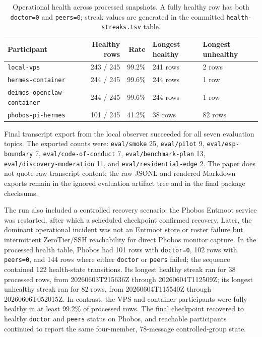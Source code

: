 \documentclass[11pt,a4paper,twocolumn]{article}
\begin{document}
\begin{table}[t]
\centering
\small
\caption{Operational health across processed snapshots. A fully healthy row
has both \texttt{doctor=0} and \texttt{peers=0}; streak values are generated in
the committed \texttt{health-streaks.tsv} table.}
\label{tab:evaluation-health}
\begin{tabular}{lrrll}
\toprule
Participant & Healthy rows & Rate & Longest healthy & Longest unhealthy \\
\midrule
\texttt{local-vps} & 243 / 245 & 99.2\% & 241 rows & 2 rows \\
\texttt{hermes-container} & 244 / 245 & 99.6\% & 244 rows & 1 row \\
\texttt{deimos-openclaw-container} & 244 / 245 & 99.6\% & 244 rows & 1 row \\
\texttt{phobos-pi-hermes} & 101 / 245 & 41.2\% & 38 rows & 82 rows \\
\bottomrule
\end{tabular}
\end{table}

Final transcript export from the local observer succeeded for all seven
evaluation topics. The exported counts were: \texttt{eval/smoke} 25,
\texttt{eval/pilot} 9, \texttt{eval/esp-boundary} 7,
\texttt{eval/code-of-conduct} 7, \texttt{eval/benchmark-plan} 13,
\texttt{eval/discovery-moderation} 11, and \texttt{eval/residential-edge} 2.
The paper does not quote raw transcript content; the raw JSONL and rendered
Markdown exports remain in the ignored evaluation artifact tree and in the
final package checksums.

The run also included a controlled recovery scenario: the Phobos Entmoot
service was restarted, after which a scheduled checkpoint confirmed recovery.
Later, the dominant operational incident was not an Entmoot store or roster
failure but intermittent ZeroTier/SSH reachability for direct Phobos monitor
capture. In the processed health table, Phobos had 101 rows with
\texttt{doctor=0}, 102 rows with \texttt{peers=0}, and 144 rows where either
\texttt{doctor} or \texttt{peers} failed; the sequence contained 122
health-state transitions. Its longest healthy streak ran for 38 processed
rows, from 20260603T215636Z through 20260604T112509Z; its longest unhealthy
streak ran for 82 rows, from 20260604T115540Z through 20260606T052015Z. In
contrast, the VPS and container participants were fully healthy in at least
99.2\% of processed rows. The final checkpoint recovered to healthy
\texttt{doctor} and \texttt{peers} status on Phobos, and reachable participants
continued to report the same four-member, 78-message controlled-group state.
\end{document}
